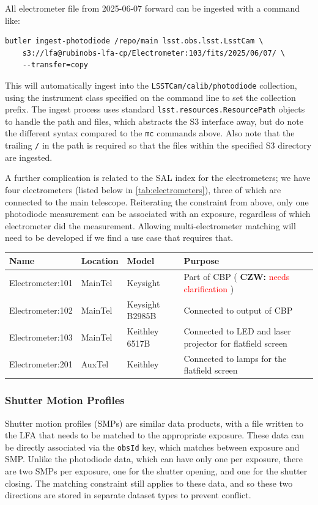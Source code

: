 \documentclass[DM,authoryear,toc]{lsstdoc}
\newcommand{\czw}[1]{
  \textbf{CZW: }\textcolor{red}{#1}
}
\begin{document}
All electrometer file from 2025-06-07 forward can be ingested with a command like:
\begin{verbatim}
butler ingest-photodiode /repo/main lsst.obs.lsst.LsstCam \
    s3://lfa@rubinobs-lfa-cp/Electrometer:103/fits/2025/06/07/ \
    --transfer=copy
\end{verbatim}
This will automatically ingest into the \verb|LSSTCam/calib/photodiode| collection, using the instrument class specified on the command line to set the collection prefix.
The ingest process uses standard \verb|lsst.resources.ResourcePath| objects to handle the path and files, which abstracts the S3 interface away, but do note the different syntax compared to the \verb|mc| commands above.
Also note that the trailing \verb|/| in the path is required so that the files within the specified S3 directory are ingested.

A further complication is related to the SAL index for the electrometers; we have four electrometers (listed below in \ref{tab:electrometers}), three of which are connected to the main telescope.
Reiterating the constraint from above, only one photodiode measurement can be associated with an exposure, regardless of which electrometer did the measurement.
Allowing multi-electrometer matching will need to be developed if we find a use case that requires that.

\begin{tabular}{l|l|l|p{0.4\textwidth}}
  \label{tab:electrometers}
    Name & Location & Model & Purpose \\
    \hline
    Electrometer:101 & MainTel & Keysight & Part of CBP (\czw{needs clarification}) \\
    Electrometer:102 & MainTel & Keysight B2985B & Connected to output of CBP \\
    Electrometer:103 & MainTel & Keithley 6517B & Connected to LED and laser projector for flatfield screen \\
    Electrometer:201 & AuxTel & Keithley & Connected to lamps for the flatfield screen \\
\end{tabular}

\subsubsection{Shutter Motion Profiles}

Shutter motion profiles (SMPs) are similar data products, with a file written to the LFA that needs to be matched to the appropriate exposure.
These data can be directly associated via the \verb|obsId| key, which matches between exposure and SMP.
Unlike the photodiode data, which can have only one per exposure, there are two SMPs per exposure, one for the shutter opening, and one for the shutter closing.
The matching constraint still applies to these data, and so these two directions are stored in separate dataset types to prevent conflict.
\end{document}
